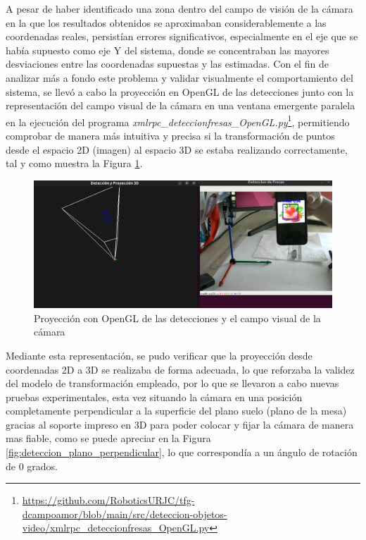 A pesar de haber identificado una zona dentro del campo de visión de la cámara en la que los resultados obtenidos se aproximaban considerablemente a las coordenadas reales, persistían errores significativos, especialmente en el eje que se había supuesto como eje Y del sistema, donde se concentraban las mayores desviaciones entre las coordenadas supuestas y las estimadas. Con el fin de analizar más a fondo este problema y validar visualmente el comportamiento del sistema, se llevó a cabo la proyección en OpenGL de las detecciones junto con la representación del campo visual de la cámara en una ventana emergente paralela en la ejecución del programa \textit{xmlrpc\_deteccionfresas\_OpenGL.py}\footnote{\url{https://github.com/RoboticsURJC/tfg-dcampoamor/blob/main/src/deteccion-objetos-video/xmlrpc_deteccionfresas_OpenGL.py}}, permitiendo comprobar de manera más intuitiva y precisa si la transformación de puntos desde el espacio 2D (imagen) al espacio 3D se estaba realizando correctamente, tal y como muestra la Figura \ref{fig:proy_OpenGL_deteccion}.

   \begin{figure}[H]
    \centering
    \begin{center}
      \includegraphics[width=140mm]{figs/Proyeccion plano mesa OpenGL con ejes coordenadas_2.png}
    \end{center}
    \caption{Proyección con OpenGL de las detecciones y el campo visual de la cámara}
    \label{fig:proy_OpenGL_deteccion}
  \end{figure}

Mediante esta representación, se pudo verificar que la proyección desde coordenadas 2D a 3D se realizaba de forma adecuada, lo que reforzaba la validez del modelo de transformación empleado, por lo que se llevaron a cabo nuevas pruebas experimentales, esta vez situando la cámara en una posición completamente perpendicular a la superficie del plano suelo (plano de la mesa) gracias al soporte impreso en 3D para poder colocar y fijar la cámara de manera mas fiable, como se puede apreciar en la Figura \ref{fig:deteccion_plano_perpendicular}, lo que correspondía a un ángulo de rotación de 0 grados. \\

